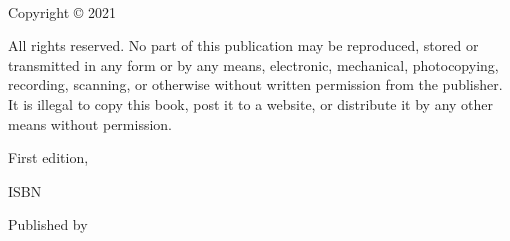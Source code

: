 
{\small
\setlength{\parindent}{0em}\setlength{\parskip}{1em}

~

\vfill

Copyright \copyright{} 2021 \authorname

All rights reserved. No part of this publication may be reproduced, stored or transmitted in any form or by any means, electronic, mechanical, photocopying, recording, scanning, or otherwise without written permission from the publisher. It is illegal to copy this book, post it to a website, or distribute it by any other means without permission.

First edition, \editionyear{}

ISBN \isbn{}  %

Published by \publisher{}
}
